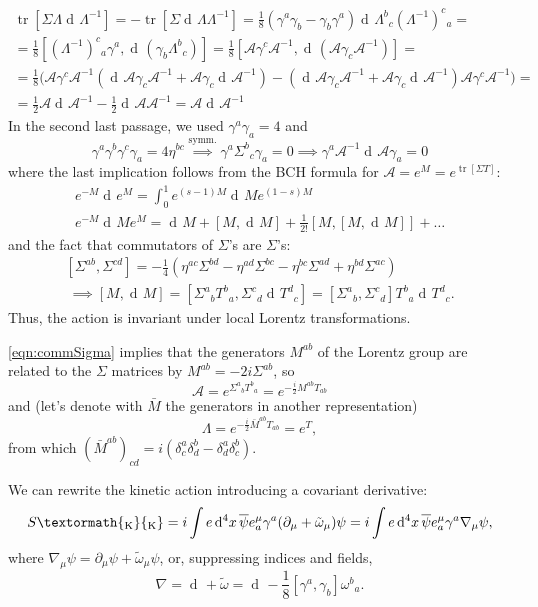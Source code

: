 \documentclass[a4paper,12pt]{book}
\newcommand{\ped}[1]{\textormath{\textsubscript{#1}}{_{\mathrm{#1}}}}
\newcommand{\dd}{\mathop{\mathrm{d}\!}{}}
\DeclareMathOperator\tr{tr}
\theoremstyle{definition}
\theoremstyle{remark}
\begin{document}
\begin{itemize}
\begin{multline*}
\tr[\Sigma\Lambda\dd\Lambda^{-1}]=-\tr[\Sigma\dd\Lambda\Lambda^{-1}]=\frac18(\gamma^a\gamma_b-\gamma_b\gamma^a)\dd\Lambda^b{}_c(\Lambda^{-1})^c{}_a=\\
=\frac18[(\Lambda^{-1})^c{}_a\gamma^a,\dd(\gamma_b\Lambda^b{}_c)]=\frac18[\mathcal A\gamma^c\mathcal A^{-1},\dd(\mathcal A\gamma_c\mathcal A^{-1})]=\\
=\frac18\bigl(\mathcal A\gamma^c\mathcal A^{-1}(\dd\mathcal A\gamma_c\mathcal A^{-1}+\mathcal A\gamma_c\dd\mathcal A^{-1})-(\dd\mathcal A\gamma_c\mathcal A^{-1}+\mathcal A\gamma_c\dd\mathcal A^{-1})\mathcal A\gamma^c\mathcal A^{-1}\bigr)=\\
=\frac12\mathcal A\dd\mathcal A^{-1}-\frac12\dd\mathcal A\mathcal A^{-1}=\mathcal A\dd\mathcal A^{-1}
\end{multline*}
In the second last passage, we used $\gamma^a\gamma_a=4$ and
\[\gamma^a\gamma^b\gamma^c\gamma_a=4\eta^{bc}\overset{\text{symm.}}{\implies}\gamma^a\Sigma^b{}_c\gamma_a=0\implies\gamma^a\mathcal A^{-1}\dd\mathcal A\gamma_a=0\]
where the last implication follows from the BCH formula for $\mathcal A=e^M=e^{\tr[\Sigma T]}$:
\begin{gather*}
e^{-M}\dd e^M=\int_0^1e^{(s-1)M}\dd Me^{(1-s)M}\\
e^{-M}\dd Me^M=\dd M+[M,\dd M]+\frac{1}{2!}[M,[M,\dd M]]+\ldots
\end{gather*}
and the fact that commutators of $\Sigma$'s are $\Sigma$'s:
\begin{gather}
\label{eqn:commSigma}
[\Sigma^{ab},\Sigma^{cd}]=-\frac{1}{4}(\eta^{ac}\Sigma^{bd}-\eta^{ad}\Sigma^{bc}-\eta^{bc}\Sigma^{ad}+\eta^{bd}\Sigma^{ac})\\\
\implies [M,\dd M]=[\Sigma^a{}_bT^b{}_a,\Sigma^c{}_d\dd T^d{}_c]=[\Sigma^a{}_b,\Sigma^c{}_d]T^b{}_a\dd T^d{}_c.\nonumber
\end{gather}
Thus, the action is invariant under local Lorentz transformations.
\end{itemize}
\cref{eqn:commSigma} implies that the generators $M^{ab}$ of the Lorentz group are related to the $\Sigma$ matrices by $M^{ab}=-2i\Sigma^{ab}$, so
\[\mathcal A=e^{\Sigma^a{}_bT^b{}_a}=e^{-\frac{i}{2}M^{ab}T_{ab}}\]
and (let's denote with $\bar M$ the generators in another representation)
\[\Lambda=e^{-\frac{i}{2}\bar M^{ab}T_{ab}}=e^T,\]
from which $(\bar M^{ab})_{cd}=i(\delta^a_c\delta^b_d-\delta^a_d\delta^b_c)$.

We can rewrite the kinetic action introducing a covariant derivative:
\[S\ped{K}=i\int e\dd^4x\,\overline\psi e^\mu_a\gamma^a(\partial_\mu+\tilde\omega_\mu)\psi=i\int e\dd^4x\,\overline\psi e^\mu_a\gamma^a\nabla_\mu\psi,\]
where $\nabla_\mu\psi=\partial_\mu\psi+\tilde\omega_\mu\psi$, or, suppressing indices and fields,
\[\nabla=\dd+\tilde\omega=\dd-\frac{1}{8}[\gamma^a,\gamma_b]\omega^b{}_a.\]
\end{document}
